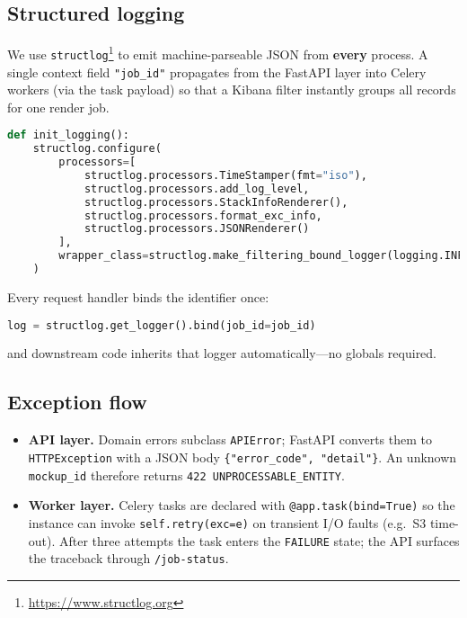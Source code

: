\subsection{Structured logging}
\label{sec:impl-logging-structured}

We use \texttt{structlog}\footnote{\url{https://www.structlog.org}} to emit
machine-parseable JSON from \textbf{every} process.  
A single context field \texttt{"job\_id"} propagates from the FastAPI layer
into Celery workers (via the task payload) so that a Kibana filter
instantly groups all records for one render job.

\begin{lstlisting}[language=python,
                   basicstyle=\scriptsize\ttfamily,
                   caption={Logging bootstrap (\texttt{app/logging.py})},
                   label={lst:logconfig}]
def init_logging():
    structlog.configure(
        processors=[
            structlog.processors.TimeStamper(fmt="iso"),
            structlog.processors.add_log_level,
            structlog.processors.StackInfoRenderer(),
            structlog.processors.format_exc_info,
            structlog.processors.JSONRenderer()
        ],
        wrapper_class=structlog.make_filtering_bound_logger(logging.INFO),
    )
\end{lstlisting}

Every request handler binds the identifier once:

\begin{lstlisting}[language=python,basicstyle=\scriptsize\ttfamily]
log = structlog.get_logger().bind(job_id=job_id)
\end{lstlisting}

and downstream code inherits that logger automatically—no globals required.

\subsection{Exception flow}
\label{sec:impl-exceptions}

\begin{itemize}
  \item \textbf{API layer.}  
        Domain errors subclass \texttt{APIError}; FastAPI converts them to
        \texttt{HTTPException} with a JSON body
        \texttt{\{"error\_code", "detail"\}}.  
        An unknown \texttt{mockup\_id} therefore returns \texttt{422 UNPROCESSABLE\_ENTITY}.
  \item \textbf{Worker layer.}  
        Celery tasks are declared with \verb|@app.task(bind=True)| so the
        instance can invoke \verb|self.retry(exc=e)| on transient I/O faults
        (e.g.\ S3 time-out).  
        After three attempts the task enters the \texttt{FAILURE} state; the
        API surfaces the traceback through \texttt{/job-status}.
\end{itemize}

